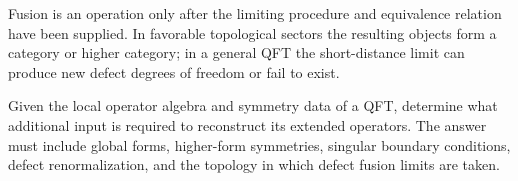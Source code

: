 Fusion is an operation only after the limiting procedure and equivalence
relation have been supplied.  In favorable topological sectors the resulting
objects form a category or higher category; in a general QFT the short-distance
limit can produce new defect degrees of freedom or fail to exist.

\begin{openproblem}
\label{op:extended-operator-reconstruction}
Given the local operator algebra and symmetry data of a QFT, determine what
additional input is required to reconstruct its extended operators.  The
answer must include global forms, higher-form symmetries, singular boundary
conditions, defect renormalization, and the topology in which defect fusion
limits are taken.
\end{openproblem}
